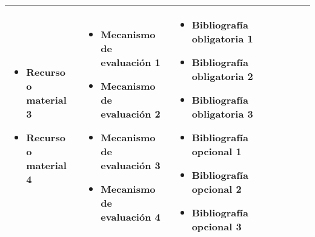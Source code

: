 \begin{landscape}
\begin{xltabular}{\linewidth}{@{}XXXXXXXX@{}}
\begin{itemize}[label={}, labelsep=0pt, left=0pt .. 0pt, itemsep=1em]
            \item Recurso o material 3
            \item Recurso o material 4
        \end{itemize} &
        \begin{itemize}[label={}, labelsep=0pt, left=0pt .. 0pt, itemsep=1em] %
            \item Mecanismo de evaluación 1
            \item Mecanismo de evaluación 2
            \item Mecanismo de evaluación 3
            \item Mecanismo de evaluación 4
        \end{itemize} &
        \begin{itemize}[label={}, labelsep=0pt, left=0pt .. 0pt, itemsep=1em] %
            \item Bibliografía obligatoria 1
            \item Bibliografía obligatoria 2
            \item Bibliografía obligatoria 3
            \item Bibliografía opcional 1
            \item Bibliografía opcional 2
            \item Bibliografía opcional 3
        \end{itemize}\\
        \bottomrule
    \end{xltabular}
\end{landscape}